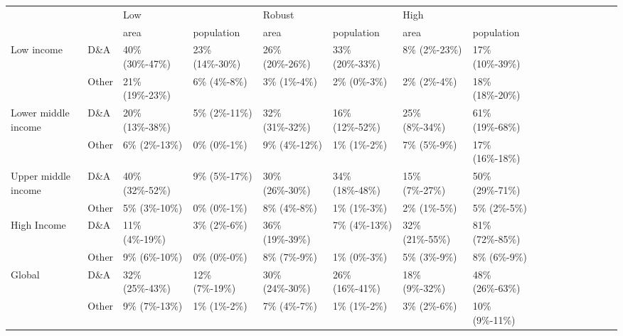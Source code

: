 \begin{tabular}{ll p{1cm} p{1cm} p{1cm} p{1cm} p{1cm} p{1cm} p{1cm} p{1cm} p{1cm} p{1cm} p{1cm} p{1cm} p{1cm} p{1cm}}
\toprule
       &       & \multicolumn{2}{L{2cm}}{Low} & \multicolumn{2}{L{2cm}}{Robust} & \multicolumn{2}{L{2cm}}{High} \\
       &       &                     area &               population &                     area &               population &                     area &               population \\
\midrule
Low income & D\&A &  40\% \mbox{(30\%-47\%)} &  23\% \mbox{(14\%-30\%)} &  26\% \mbox{(20\%-26\%)} &  33\% \mbox{(20\%-33\%)} &    8\% \mbox{(2\%-23\%)} &  17\% \mbox{(10\%-39\%)} \\
       & Other &  21\% \mbox{(19\%-23\%)} &     6\% \mbox{(4\%-8\%)} &     3\% \mbox{(1\%-4\%)} &     2\% \mbox{(0\%-3\%)} &     2\% \mbox{(2\%-4\%)} &  18\% \mbox{(18\%-20\%)} \\
Lower middle income & D\&A &  20\% \mbox{(13\%-38\%)} &    5\% \mbox{(2\%-11\%)} &  32\% \mbox{(31\%-32\%)} &  16\% \mbox{(12\%-52\%)} &   25\% \mbox{(8\%-34\%)} &  61\% \mbox{(19\%-68\%)} \\
       & Other &    6\% \mbox{(2\%-13\%)} &     0\% \mbox{(0\%-1\%)} &    9\% \mbox{(4\%-12\%)} &     1\% \mbox{(1\%-2\%)} &     7\% \mbox{(5\%-9\%)} &  17\% \mbox{(16\%-18\%)} \\
Upper middle income & D\&A &  40\% \mbox{(32\%-52\%)} &    9\% \mbox{(5\%-17\%)} &  30\% \mbox{(26\%-30\%)} &  34\% \mbox{(18\%-48\%)} &   15\% \mbox{(7\%-27\%)} &  50\% \mbox{(29\%-71\%)} \\
       & Other &    5\% \mbox{(3\%-10\%)} &     0\% \mbox{(0\%-1\%)} &     8\% \mbox{(4\%-8\%)} &     1\% \mbox{(1\%-3\%)} &     2\% \mbox{(1\%-5\%)} &     5\% \mbox{(2\%-5\%)} \\
High Income & D\&A &   11\% \mbox{(4\%-19\%)} &     3\% \mbox{(2\%-6\%)} &  36\% \mbox{(19\%-39\%)} &    7\% \mbox{(4\%-13\%)} &  32\% \mbox{(21\%-55\%)} &  81\% \mbox{(72\%-85\%)} \\
       & Other &    9\% \mbox{(6\%-10\%)} &     0\% \mbox{(0\%-0\%)} &     8\% \mbox{(7\%-9\%)} &     1\% \mbox{(0\%-3\%)} &     5\% \mbox{(3\%-9\%)} &     8\% \mbox{(6\%-9\%)} \\
Global & D\&A &  32\% \mbox{(25\%-43\%)} &   12\% \mbox{(7\%-19\%)} &  30\% \mbox{(24\%-30\%)} &  26\% \mbox{(16\%-41\%)} &   18\% \mbox{(9\%-32\%)} &  48\% \mbox{(26\%-63\%)} \\
       & Other &    9\% \mbox{(7\%-13\%)} &     1\% \mbox{(1\%-2\%)} &     7\% \mbox{(4\%-7\%)} &     1\% \mbox{(1\%-2\%)} &     3\% \mbox{(2\%-6\%)} &   10\% \mbox{(9\%-11\%)} \\
\bottomrule
\end{tabular}
